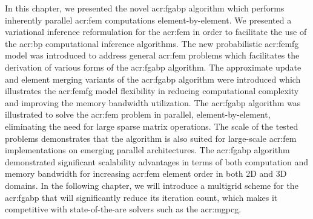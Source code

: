 In this chapter, we presented the novel \gls{acr:fgabp} algorithm which performs inherently parallel \gls{acr:fem} computations element-by-element.
We presented a variational inference reformulation for the \gls{acr:fem} in order to facilitate the use of the \gls{acr:bp} computational inference algorithms.
The new probabilistic \gls{acr:femfg} model was introduced to address general \gls{acr:fem} problems which facilitates the derivation of various forms of the \gls{acr:fgabp} algorithm.
The approximate update and element merging variants of the \gls{acr:fgabp} algorithm were introduced which illustrates the \gls{acr:femfg} model flexibility in reducing computational complexity and improving the memory bandwidth utilization.
The \gls{acr:fgabp} algorithm was illustrated to solve the \gls{acr:fem} problem in parallel, element-by-element, eliminating the need for large sparse matrix operations.
The scale of the tested problems demonstrates that the algorithm is also suited for large-scale \gls{acr:fem} implementations on emerging parallel architectures.
The \gls{acr:fgabp} algorithm demonstrated significant scalability advantages in terms of both computation and memory bandwidth for increasing \gls{acr:fem} element order in both 2D and 3D domains.
In the following chapter, we will introduce a multigrid scheme for the \gls{acr:fgabp} that will significantly reduce its iteration count, which makes it competitive with state-of-the-are solvers such as the \gls{acr:mgpcg}.






